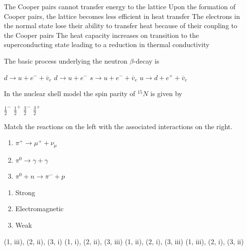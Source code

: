 \documentclass{exam}
\begin{document}
\begin{questions}
\begin{choices}
	\choice The Cooper pairs cannot transfer energy to the lattice
	\choice Upon the formation of Cooper pairs, the lattice becomes less efficient in heat transfer
	\choice The electrons in the normal state lose their ability to transfer heat because of their coupling to the Cooper pairs
	\choice The heat capacity increases on transition to the superconducting state leading to a reduction in thermal conductivity
\end{choices}

\question The basic process underlying the neutron $\beta$-decay is\hfill{}

\begin{oneparchoices}
	\choice $d \rightarrow u + e^{-} + \overline{v}_{e}$
	\choice $d \rightarrow u + e^{-}$
	\choice $s \rightarrow u + e^{-} + \overline{v}_{e}$
	\choice $u \rightarrow d + e^{+} + \overline{v}_{e}$
\end{oneparchoices}

\question In the nuclear shell model the spin parity of ${}^{15}N$ is given by\hfill{}

\begin{oneparchoices}
	\choice $\frac{1}{2}^{-}$ \choice $\frac{1}{2}^{+}$ \choice $\frac{3}{2}^{-}$ \choice $\frac{3}{2}^{+}$
\end{oneparchoices}

\question Match the reactions on the left with the associated interactions on the right.\hfill{}

\begin{multicols}{2}
\begin{enumerate}[label=(\arabic*)]
		\item $\pi^{+} \rightarrow \mu^{+} + \nu_{\mu}$
		\item $\pi^{0} \rightarrow \gamma + \gamma$
		\item $\pi^{0} + n \rightarrow \pi^{-} + p$
	\end{enumerate}
\columnbreak
\begin{enumerate}[label=(\roman*)]
		\item Strong
		\item Electromagnetic
		\item Weak
	\end{enumerate}
\end{multicols}

\begin{oneparchoices}
	\choice (1, iii), (2, ii), (3, i) \choice (1, i), (2, ii), (3, iii)
	\choice (1, ii), (2, i), (3, iii) \choice (1, iii), (2, i), (3, ii)
\end{oneparchoices}


\end{questions}
\end{document}
